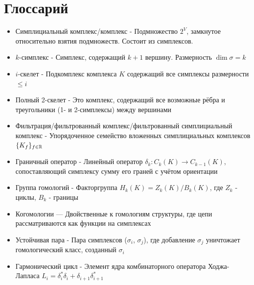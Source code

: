 \documentclass{article}
\begin{document}
\section{Глоссарий}\label{glossary}
\begin{itemize}
  \item Симплициальный комплекс/комплекс - Подмножество $2^V$, замкнутое относительно взятия подмножеств. Состоит из симплексов.
  \item $k$-симплекс - Симплекс, содержащий $k+1$ вершину. Размерность $\dim\sigma = k$
  \item $i$-скелет - Подкомплекс комплекса $K$ содержащий все симплексы размерности $\leq i$
  \item Полный 2-скелет - Это комплекс, содержащий все возможные рёбра и треугольники (1- и 2-симплексы) между вершинами
  \item Фильтрация/фильтрованный комплекс/фильтрованный симплициальный комплекс - Упорядоченное семейство вложенных симплициальных комплексов $\{K_f\}_{f\in\mathbb{R}}$
  \item Граничный оператор - Линейный оператор $\delta_k\colon C_k(K)\to C_{k-1}(K)$, сопоставляющий симплексу сумму его граней с учётом ориентации
  \item Группа гомологий - Факторгруппа $H_k(K) = Z_k(K)/B_k(K)$, где $Z_k$ - циклы, $B_k$ - границы
  \item Когомологии — Двойственные к гомологиям структуры, где цепи рассматриваются как функции на симплексах
  \item Устойчивая пара - Пара симплексов ($\sigma_i$, $\sigma_j$), где добавление $\sigma_j$ уничтожает гомологический класс, созданный $\sigma_i$
  \item Гармонический цикл - Элемент ядра комбинаторного оператора Ходжа-Лапласа $L_i = \delta_i^*\delta_i + \delta_{i+1}\delta_{i+1}^*$
\end{itemize}
\newpage
\printbibliography

\end{document}
